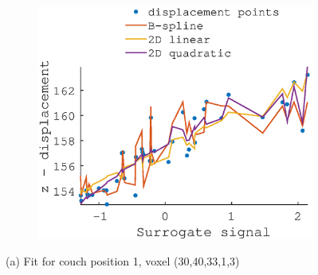 \documentclass[11pt,a4paper,oneside]{report}
\begin{document}
\begin{figure}
\begin{subfigure}[b]{0.33\textwidth}
  \end{subfigure}
    ~ %
  \begin{subfigure}[b]{0.33\textwidth}
    \includegraphics[width=\textwidth]{figures/task2/fit_round3_couch1.eps}
  \end{subfigure}
  (a) Fit for couch position 1, voxel (30,40,33,1,3)
  \vspace*{1em}
  

\end{figure}
\end{document}
